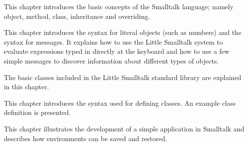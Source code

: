 
\secdown

\secdown

This chapter introduces the basic concepts of the Smalltalk language;
namely object, method, class, inheritance and overriding.

\secup

\secdown

This chapter introduces the syntax for literal objects (such as numbers)
and the syntax for messages. It explains how to use the Little Smalltalk
system to evaluate expressions typed in directly at the keyboard and
how to use a few simple messages to discover information about different types of objects.


\secup

\secdown

The basic classes included in the Little Smalltalk standard library are
explained in this chapter.


\secup

\secdown

This chapter introduces the syntax used for defining classes. An example class definition is presented.


\secup

\secdown

This chapter illustrates the development of a simple application in
Smalltalk and describes how environments can be saved and restored.


\secup

\secdown

